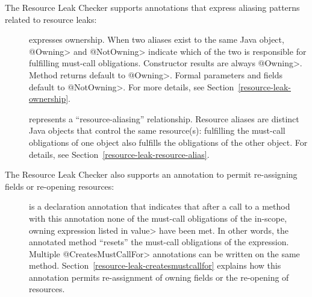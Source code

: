 The Resource Leak Checker supports annotations that express
aliasing patterns related to resource leaks:

\begin{description}

\item[]
\item[]
  expresses ownership.  When two aliases exist to the same Java object,
  \<@Owning> and \<@NotOwning> indicate which of the two is responsible for
  fulfilling must-call obligations.
  Constructor results are always \<@Owning>. Method returns default to
  \<@Owning>.  Formal parameters and fields default to \<@NotOwning>.
  For more details, see Section~\ref{resource-leak-ownership}.

\item[]
  represents a ``resource-aliasing'' relationship.  Resource aliases are
  distinct Java objects that control the same resource(s):
  fulfilling the must-call obligations of one object also
  fulfills the obligations of the other object.  For details,
  see Section~\ref{resource-leak-resource-alias}.

\end{description}

The Resource Leak Checker also supports an annotation to permit re-assigning
fields or re-opening resources:

\begin{description}

\item[]
  is a declaration annotation that indicates that after a call to a method
  with this annotation none of the must-call obligations of the in-scope, owning expression
  listed in \<value> have been met.
  In other words, the annotated method ``resets'' the must-call obligations of the expression.
  Multiple \<@CreatesMustCallFor>
  annotations can be written on the same method.  Section~\ref{resource-leak-createsmustcallfor}
  explains how this annotation permits re-assignment of owning
  fields or the re-opening of resources.

\end{description}



